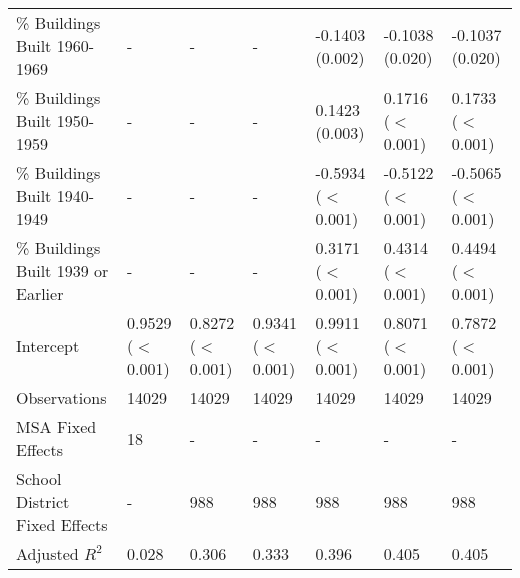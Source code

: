\begin{table}[h]
\begin{tabular}{l|llllll}
\% Buildings Built 1960-1969 &- & - & - & -0.1403 (0.002) & -0.1038 (0.020) & -0.1037 (0.020) \\
\% Buildings Built 1950-1959 &- & - & - & 0.1423 (0.003) & 0.1716 ($<$0.001) & 0.1733 ($<$0.001) \\
\% Buildings Built 1940-1949 &- & - & - & -0.5934 ($<$0.001) & -0.5122 ($<$0.001) & -0.5065 ($<$0.001) \\
\% Buildings Built 1939 or Earlier &- & - & - & 0.3171 ($<$0.001) & 0.4314 ($<$0.001) & 0.4494 ($<$0.001) \\
Intercept &0.9529 ($<$0.001) & 0.8272 ($<$0.001) & 0.9341 ($<$0.001) & 0.9911 ($<$0.001) & 0.8071 ($<$0.001) & 0.7872 ($<$0.001) \\
Observations &14029 & 14029 & 14029 & 14029 & 14029 & 14029 \\
MSA Fixed Effects &18 & - & - & - & - & - \\
School District Fixed Effects &- & 988 & 988 & 988 & 988 & 988 \\
Adjusted $R^2$ &0.028 & 0.306 & 0.333 & 0.396 & 0.405 & 0.405 \\\hline
\end{tabular}
\end{table}
